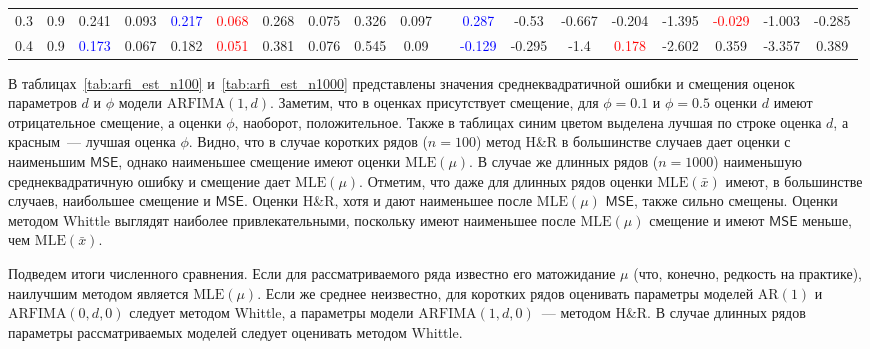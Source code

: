 \documentclass[specialist,
substylefile = spbu_report.rtx,
subf,href,colorlinks=true, 12pt]{disser}
\theoremstyle{definition}
\begin{document}
\begin{table}
{\begin{tabular}{m{1cm}m{1cm}ccccccccm{0.2cm}cccccccc}
			0.3 & 0.9    & 0.241                                        & 0.093                                      & \textcolor{blue}{0.217}                       & \textcolor{red}{0.068}      & 0.268                   & 0.075                                   & 0.326                                      & 0.097                    &                             & \textcolor{blue}{0.287}  & -0.53                  & -0.667                   & -0.204                 & -1.395   & \textcolor{red}{-0.029} & -1.003                   & -0.285                  \\
			0.4 & 0.9    & \textcolor{blue}{0.173}                      & 0.067                                      & 0.182                                         & \textcolor{red}{0.051}      & 0.381                   & 0.076                                   & 0.545                                      & 0.09                     &                             & \textcolor{blue}{-0.129} & -0.295                 & -1.4                     & \textcolor{red}{0.178} & -2.602   & 0.359                   & -3.357                   & 0.389                   \\
			\hline
		\end{tabular}
	}
\end{table}

В таблицах~\ref{tab:arfi_est_n100} и~\ref{tab:arfi_est_n1000} представлены значения среднеквадратичной ошибки и смещения оценок параметров $d$ и $\phi$ модели $\mathrm{ARFIMA}(1, d)$. Заметим, что в оценках присутствует смещение, для $\phi=0.1$ и $\phi=0.5$ оценки $d$ имеют отрицательное смещение, а оценки $\phi$, наоборот, положительное. Также в таблицах синим цветом выделена лучшая по строке оценка $d$, а красным~--- лучшая оценка $\phi$. Видно, что в случае коротких рядов ($n=100$) метод H\&R в большинстве случаев дает оценки с наименьшим $\mathsf{MSE}$, однако наименьшее смещение имеют оценки $\mathrm{MLE}(\mu)$. В случае же длинных рядов ($n=1000$) наименьшую среднеквадратичную ошибку и смещение дает $\mathrm{MLE}(\mu)$. Отметим, что даже для длинных рядов оценки $\mathrm{MLE}(\bar x)$ имеют, в большинстве случаев, наибольшее смещение и $\mathsf{MSE}$. Оценки H\&R, хотя и дают наименьшее после $\mathrm{MLE}(\mu)$ $\mathsf{MSE}$, также сильно смещены. Оценки методом Whittle выглядят наиболее привлекательными, поскольку имеют наименьшее после $\mathrm{MLE}(\mu)$ смещение и имеют $\mathsf{MSE}$ меньше, чем $\mathrm{MLE}(\bar x)$.

Подведем итоги численного сравнения. Если для рассматриваемого ряда известно его матожидание $\mu$ (что, конечно, редкость на практике), наилучшим методом является $\mathrm{MLE}(\mu)$. Если же среднее неизвестно, для коротких рядов оценивать параметры моделей $\mathrm{AR}(1)$ и $\mathrm{ARFIMA}(0, d, 0)$ следует методом Whittle, а параметры модели $\mathrm{ARFIMA}(1, d, 0)$~--- методом H\&R. В случае длинных рядов параметры рассматриваемых моделей следует оценивать методом Whittle.
\end{document}
